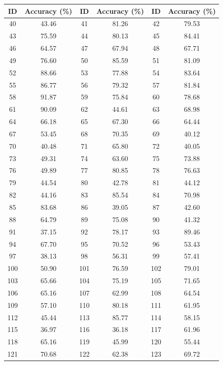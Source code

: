 \documentclass{article}
\begin{document}
\begin{table}[H]
\centering
\begin{tabular*}{\textwidth}{@{\extracolsep{\fill}}cccccc}
\toprule
\textbf{ID} & \textbf{Accuracy (\%)} & \textbf{ID} & \textbf{Accuracy (\%)} & \textbf{ID} & \textbf{Accuracy (\%)} \\
\midrule
    40 & 43.46 & 41 & 81.26 & 42 & 79.53 \\
43 & 75.59 & 44 & 80.13 & 45 & 84.41 \\
46 & 64.57 & 47 & 67.94 & 48 & 67.71 \\
49 & 76.60 & 50 & 85.59 & 51 & 81.09 \\
52 & 88.66 & 53 & 77.88 & 54 & 83.64 \\
55 & 86.77 & 56 & 79.32 & 57 & 81.84 \\
58 & 91.87 & 59 & 75.84 & 60 & 78.68 \\
61 & 90.09 & 62 & 44.61 & 63 & 68.98 \\
64 & 66.18 & 65 & 67.30 & 66 & 64.44 \\
67 & 53.45 & 68 & 70.35 & 69 & 40.12 \\
70 & 40.48 & 71 & 65.80 & 72 & 40.05 \\
73 & 49.31 & 74 & 63.60 & 75 & 73.88 \\
76 & 49.89 & 77 & 80.85 & 78 & 76.63 \\
79 & 44.54 & 80 & 42.78 & 81 & 44.12 \\
82 & 44.16 & 83 & 85.54 & 84 & 70.98 \\
85 & 83.68 & 86 & 39.05 & 87 & 42.60 \\
88 & 64.79 & 89 & 75.08 & 90 & 41.32 \\
91 & 37.15 & 92 & 78.17 & 93 & 89.46 \\
94 & 67.70 & 95 & 70.52 & 96 & 53.43 \\
97 & 38.13 & 98 & 56.31 & 99 & 57.41 \\
100 & 50.90 & 101 & 76.59 & 102 & 79.01 \\
103 & 65.66 & 104 & 75.19 & 105 & 71.65 \\
106 & 65.16 & 107 & 62.99 & 108 & 64.54 \\
109 & 57.10 & 110 & 80.18 & 111 & 61.95 \\
112 & 45.44 & 113 & 85.77 & 114 & 58.15 \\
115 & 36.97 & 116 & 36.18 & 117 & 61.96 \\
118 & 65.16 & 119 & 45.99 & 120 & 55.44 \\
121 & 70.68 & 122 & 62.38 & 123 & 69.72 \\

\end{tabular*}
\end{table}
\end{document}
